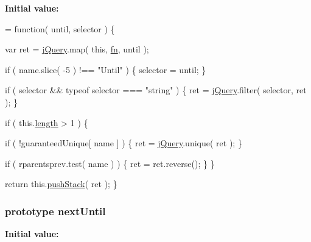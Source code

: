 {\bfseries Initial value\-:}
\begin{DoxyCode}
= \textcolor{keyword}{function}( until, selector ) \{


        var ret = \hyperlink{jquery-1_810_82-vsdoc_8js_add5237586d970a38a81f990e8eb28c6c}{jQuery}.map( \textcolor{keyword}{this}, \hyperlink{jquery-1_810_82-vsdoc_8js_acef6bdaf6b9b20fdcca1ea86f0902c3b}{fn}, until );

        \textcolor{keywordflow}{if} ( name.slice( -5 ) !== \textcolor{stringliteral}{"Until"} ) \{
            selector = until;
        \}

        \textcolor{keywordflow}{if} ( selector && typeof selector === \textcolor{stringliteral}{"string"} ) \{
            ret = \hyperlink{jquery-1_810_82-vsdoc_8js_add5237586d970a38a81f990e8eb28c6c}{jQuery}.filter( selector, ret );
        \}

        \textcolor{keywordflow}{if} ( this.\hyperlink{jquery-1_810_82-vsdoc_8js_aa7de35d58da66d9944ab9cbe82c19640}{length} > 1 ) \{
            
            \textcolor{keywordflow}{if} ( !guaranteedUnique[ name ] ) \{
                ret = \hyperlink{jquery-1_810_82-vsdoc_8js_add5237586d970a38a81f990e8eb28c6c}{jQuery}.unique( ret );
            \}

            
            \textcolor{keywordflow}{if} ( rparentsprev.test( name ) ) \{
                ret = ret.reverse();
            \}
        \}

        \textcolor{keywordflow}{return} this.\hyperlink{jquery-1_810_82-vsdoc_8js_afc3a7db1ef2b526338c06c07cecccd44}{pushStack}( ret );
    \}
\end{DoxyCode}
\hypertarget{jquery-1_810_82-vsdoc_8js_af68b07d83c395633085335fd87872672}{
\subsubsection[{next\-Until}]{ {\bf prototype} next\-Until}}\label{jquery-1_810_82-vsdoc_8js_af68b07d83c395633085335fd87872672}
{\bfseries Initial value\-:}
